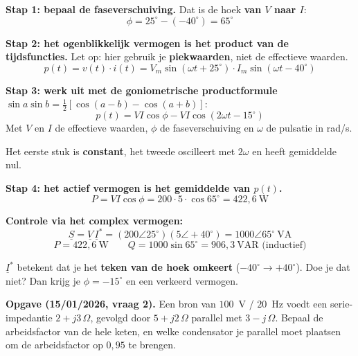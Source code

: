 \documentclass[a4paper,11pt]{article}
\begin{document}
\begin{oefenblok}

    \textbf{Stap 1: bepaal de faseverschuiving.}
    Dat is de hoek \textbf{van $V$ naar $I$}:
    \[\phi = 25^\circ - (-40^\circ) = 65^\circ\]

    \textbf{Stap 2: het ogenblikkelijk vermogen is het product van de tijdsfuncties.}
    Let op: hier gebruik je \textbf{piekwaarden}, niet de effectieve waarden.
    \[p(t) = v(t) \cdot i(t) = V_m\sin(\omega t + 25^\circ)\cdot I_m\sin(\omega t - 40^\circ)\]

    \textbf{Stap 3: werk uit met de goniometrische productformule}
    $\sin a\sin b = \tfrac{1}{2}[\cos(a-b) - \cos(a+b)]$:
    \[p(t) = VI\cos\phi - VI\cos(2\omega t - 15^\circ)\]
    Met $V$ en $I$ de effectieve waarden, $\phi$ de faseverschuiving en $\omega$ de pulsatie in rad/s.

    Het eerste stuk is \textbf{constant}, het tweede oscilleert met $2\omega$ en heeft gemiddelde nul.

    \textbf{Stap 4: het actief vermogen is het gemiddelde van $p(t)$.}
    \[P = VI\cos\phi = 200 \cdot 5 \cdot \cos 65^\circ = \boxed{422{,}6\ \text{W}}\]

    \textbf{Controle via het complex vermogen:}
    \[\underline{S} = \underline{V}\,\underline{I}^{*} = (200\angle 25^\circ)(5\angle +40^\circ) = 1000\angle 65^\circ\ \text{VA}\]
    \[P = 422{,}6\ \text{W} \qquad Q = 1000\sin 65^\circ = 906{,}3\ \text{VAR (inductief)}\]

    \begin{waarschuwing}
        $\underline{I}^{*}$ betekent dat je het \textbf{teken van de hoek omkeert}
        ($-40^\circ \rightarrow +40^\circ$). Doe je dat niet? Dan krijg je $\phi = -15^\circ$ en een
        verkeerd vermogen.
    \end{waarschuwing}
\end{oefenblok}

\textbf{Opgave (15/01/2026, vraag 2).}
Een bron van $100$~V / $20$~Hz voedt een serie-impedantie $2+j3\,\Omega$, gevolgd door
$5+j2\,\Omega$ parallel met $3-j\,\Omega$.
Bepaal de arbeidsfactor van de hele keten, en welke condensator je parallel moet plaatsen om de
arbeidsfactor op $0{,}95$ te brengen.
\end{document}
